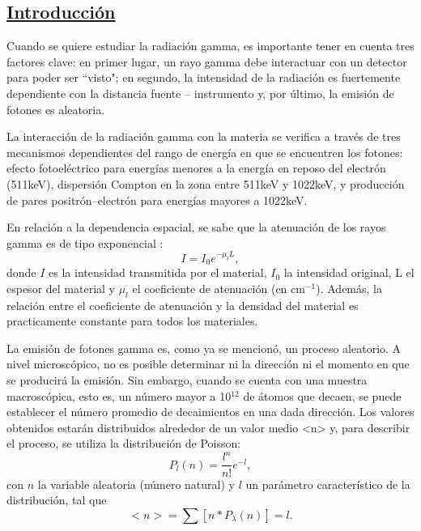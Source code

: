 \documentclass[twoside]{article}
\begin{document}
\begin{multicols}{2} %


\section*{\underline{Introducción}}
\noindent Cuando se quiere estudiar la radiación gamma, es importante tener en cuenta tres factores clave: en primer lugar, un rayo gamma debe interactuar con un detector para poder ser ``visto"; en segundo, la intensidad de la radiación es fuertemente dependiente con la distancia fuente -- instrumento y, por último, la emisión de fotones es aleatoria.

La interacción de la radiación gamma con la materia se verifica a través de tres mecanismos dependientes del rango de energía en que se encuentren los fotones\cite{Nelson}: efecto fotoeléctrico para energías menores a la energía en reposo del electrón (511keV), dispersión Compton en la zona entre 511keV y 1022keV, y producción de pares positrón--electrón para energías mayores a 1022keV. %

En relación a la dependencia espacial, se sabe que la atenuación de los rayos gamma es de tipo exponencial \cite{Nelson}:
\begin{equation}
    I = I_0  e^{-\mu _l L},
\end{equation}
donde $I$ es la intensidad transmitida por el material, $I_0$ la intensidad original, L el espesor del material y $\mu_l$ el coeficiente de atenuación (en cm$^{-1}$). Además, la relación entre el coeficiente de atenuación y la densidad del material es practicamente constante para todos los materiales.

La emisión de fotones gamma es, como ya se mencionó, un proceso aleatorio\cite{poisson}. A nivel microscópico, no es posible determinar ni la dirección ni el momento en que se producirá la emisión. Sin embargo, cuando se cuenta con una muestra macroscópica, esto es, un número mayor a 10$^{12}$ de átomos que decaen, se puede establecer el número promedio de decaimientos en una dada dirección. Los valores obtenidos estarán distribuidos alrededor de un valor medio <n>  y, para describir el proceso, se utiliza la distribución de Poisson:
\begin{equation}
    P_l (n) = \frac{l^n}{n!} e^{-l}, 
\end{equation}
con $n$ la variable aleatoria (número natural) y $l$ un parámetro característico de la distribución, tal que
\begin{equation}
    <n> = \sum [n*P_{\lambda}(n)] = l.
\end{equation}


\end{multicols}
\end{document}
